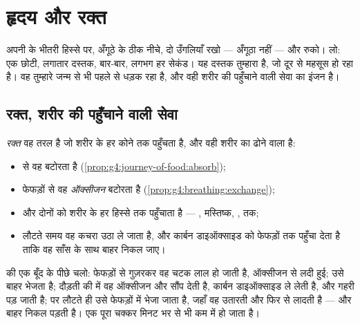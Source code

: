 \chapter{हृदय और रक्त}\label{ch:g4:heart-and-blood}

अपनी  के भीतरी हिस्से पर, अँगूठे के ठीक नीचे, दो उँगलियाँ रखो
--- अँगूठा नहीं --- और रुको। लो: एक छोटी, लगातार दस्तक, बार-बार, लगभग
हर सेकंड। यह दस्तक तुम्हारा  है, जो दूर से महसूस हो रहा है। वह
तुम्हारे जन्म से भी पहले से धड़क रहा है, और वही शरीर की पहुँचाने वाली
सेवा का इंजन है।

\section{रक्त, शरीर की पहुँचाने वाली सेवा}

\begin{proposition}[रक्त क्या ढोता है]\label{prop:g4:heart-and-blood:carries}
\emph{रक्त} वह तरल है जो शरीर के हर कोने तक पहुँचता है, और
वही शरीर का ढोने वाला है:
\begin{itemize}
  \item {} से वह \emph{} बटोरता है
        (\cref{prop:g4:journey-of-food:absorb});
  \item फेफड़ों से वह \emph{ऑक्सीजन} बटोरता है
        (\cref{prop:g4:breathing:exchange});
  \item और दोनों को शरीर के हर हिस्से तक पहुँचाता है --- ,
        मस्तिष्क, ,  तक;
  \item लौटते समय वह कचरा उठा ले जाता है, और कार्बन डाइऑक्साइड को
        फेफड़ों तक पहुँचा देता है ताकि वह साँस के साथ बाहर निकल जाए।
\end{itemize}
\end{proposition}
\admitted

\begin{example}[एक चक्कर]\label{ex:g4:heart-and-blood:round}
 की एक बूँद के पीछे चलो: फेफड़ों से गुज़रकर वह चटक लाल हो जाती है,
ऑक्सीजन से लदी हुई;  उसे बाहर भेजता है; दौड़ती  की  में वह
ऑक्सीजन और  सौंप देती है, कार्बन डाइऑक्साइड ले लेती है, और
गहरी पड़ जाती है;  पर लौटते ही उसे फेफड़ों में भेजा जाता है, जहाँ
वह उतारती और फिर से लादती है --- और बाहर निकल पड़ती है। एक पूरा चक्कर
मिनट भर से भी कम में हो जाता है।
\end{example}

